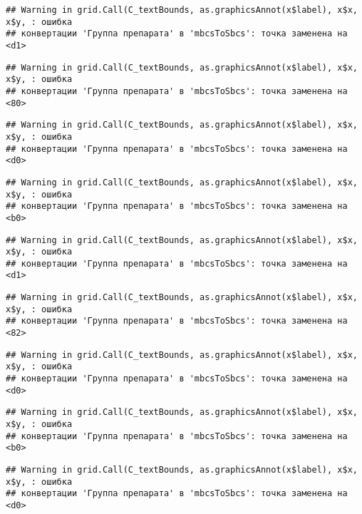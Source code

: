 \documentclass[
]{article}
\begin{document}
\begin{verbatim}
## Warning in grid.Call(C_textBounds, as.graphicsAnnot(x$label), x$x, x$y, : ошибка
## конвертации 'Группа препарата' в 'mbcsToSbcs': точка заменена на <d1>
\end{verbatim}

\begin{verbatim}
## Warning in grid.Call(C_textBounds, as.graphicsAnnot(x$label), x$x, x$y, : ошибка
## конвертации 'Группа препарата' в 'mbcsToSbcs': точка заменена на <80>
\end{verbatim}

\begin{verbatim}
## Warning in grid.Call(C_textBounds, as.graphicsAnnot(x$label), x$x, x$y, : ошибка
## конвертации 'Группа препарата' в 'mbcsToSbcs': точка заменена на <d0>
\end{verbatim}

\begin{verbatim}
## Warning in grid.Call(C_textBounds, as.graphicsAnnot(x$label), x$x, x$y, : ошибка
## конвертации 'Группа препарата' в 'mbcsToSbcs': точка заменена на <b0>
\end{verbatim}

\begin{verbatim}
## Warning in grid.Call(C_textBounds, as.graphicsAnnot(x$label), x$x, x$y, : ошибка
## конвертации 'Группа препарата' в 'mbcsToSbcs': точка заменена на <d1>
\end{verbatim}

\begin{verbatim}
## Warning in grid.Call(C_textBounds, as.graphicsAnnot(x$label), x$x, x$y, : ошибка
## конвертации 'Группа препарата' в 'mbcsToSbcs': точка заменена на <82>
\end{verbatim}

\begin{verbatim}
## Warning in grid.Call(C_textBounds, as.graphicsAnnot(x$label), x$x, x$y, : ошибка
## конвертации 'Группа препарата' в 'mbcsToSbcs': точка заменена на <d0>
\end{verbatim}

\begin{verbatim}
## Warning in grid.Call(C_textBounds, as.graphicsAnnot(x$label), x$x, x$y, : ошибка
## конвертации 'Группа препарата' в 'mbcsToSbcs': точка заменена на <b0>
\end{verbatim}

\begin{verbatim}
## Warning in grid.Call(C_textBounds, as.graphicsAnnot(x$label), x$x, x$y, : ошибка
## конвертации 'Группа препарата' в 'mbcsToSbcs': точка заменена на <d0>
\end{verbatim}
\end{document}
